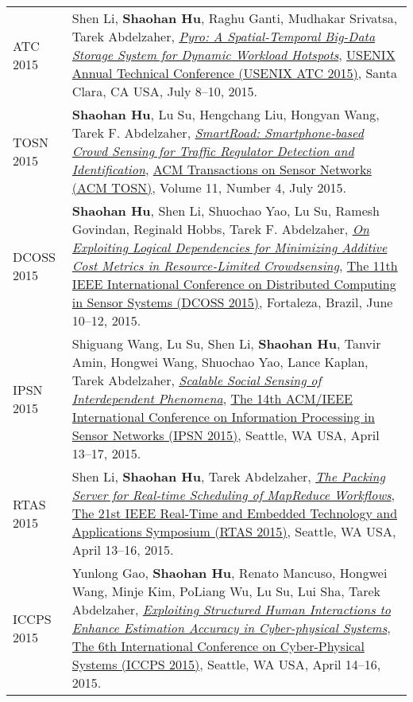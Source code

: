 \begin{longtabu}{p{.51\sectionwidth} p{.78\resumewidth}}
{\sc ATC 2015}\hypertarget{li2015atc}{} &
Shen Li, \textbf{Shaohan Hu}, Raghu Ganti, Mudhakar Srivatsa, Tarek Abdelzaher,
\href{https://www.usenix.org/system/files/conference/atc15/atc15-paper-li-shen.pdf}{\emph{Pyro: A Spatial-Temporal Big-Data Storage System for Dynamic Workload Hotspots}},
\href{https://www.usenix.org/conference/atc15}{\textsf{USENIX Annual Technical Conference (USENIX ATC 2015)}},
Santa Clara, CA USA, July 8--10, 2015. \\

{\sc TOSN 2015}\hypertarget{hu2015tosn}{} &
\textbf{Shaohan Hu}, Lu Su, Hengchang Liu, Hongyan Wang, Tarek F. Abdelzaher,
\href{http://dl.acm.org/citation.cfm?id=2770876}{\emph{SmartRoad: Smartphone-based Crowd Sensing for Traffic Regulator Detection and Identification}},
\href{http://tosn.acm.org/}{\textsf{ACM Transactions on Sensor Networks (ACM TOSN)}},
Volume 11, Number 4, July 2015. \\

{\sc DCOSS 2015}\hypertarget{hu2015dcoss}{} &
\textbf{Shaohan Hu}, Shen Li, Shuochao Yao, Lu Su, Ramesh Govindan, Reginald Hobbs, Tarek F. Abdelzaher,
\href{http://ieeexplore.ieee.org/document/7165037}{\emph{On Exploiting Logical Dependencies for Minimizing Additive Cost Metrics in Resource-Limited Crowdsensing}},
\href{http://www.dcoss.org/}{\textsf{The 11th IEEE International Conference on Distributed Computing in Sensor Systems (DCOSS 2015)}},
Fortaleza, Brazil, June 10--12, 2015. \\

{\sc IPSN 2015}\hypertarget{wang2015ipsn}{} &
Shiguang Wang, Lu Su, Shen Li, \textbf{Shaohan Hu}, Tanvir Amin, Hongwei Wang, Shuochao Yao, Lance Kaplan, Tarek Abdelzaher,
\href{http://dl.acm.org/citation.cfm?id=2737114}{\emph{Scalable Social Sensing of Interdependent Phenomena}},
\href{http://ipsn.acm.org/2015/}{\textsf{The 14th ACM/IEEE International Conference on Information Processing in Sensor Networks (IPSN 2015)}},
Seattle, WA USA, April 13--17, 2015. \\

{\sc RTAS 2015}\hypertarget{li2015rtas}{} &
Shen Li, \textbf{Shaohan Hu}, Tarek Abdelzaher,
\href{http://ieeexplore.ieee.org/document/7108416}{\emph{The Packing Server for Real-time Scheduling of MapReduce Workflows}},
\href{http://2015.rtas.org/}{\textsf{The 21st IEEE Real-Time and Embedded Technology and Applications Symposium (RTAS 2015)}},
Seattle, WA USA, April 13--16, 2015. \\

{\sc ICCPS 2015}\hypertarget{gao2015iccps}{} &
Yunlong Gao, \textbf{Shaohan Hu}, Renato Mancuso, Hongwei Wang, Minje Kim, PoLiang Wu, Lu Su, Lui Sha, Tarek Abdelzaher,
\href{http://dl.acm.org/citation.cfm?id=2735960.2735965}{\emph{Exploiting Structured Human Interactions to Enhance Estimation Accuracy in Cyber-physical Systems}},
\href{http://iccps.acm.org/2015/}{\textsf{The 6th International Conference on Cyber-Physical Systems (ICCPS 2015)}},
Seattle, WA USA, April 14--16, 2015. \\


\end{longtabu}
